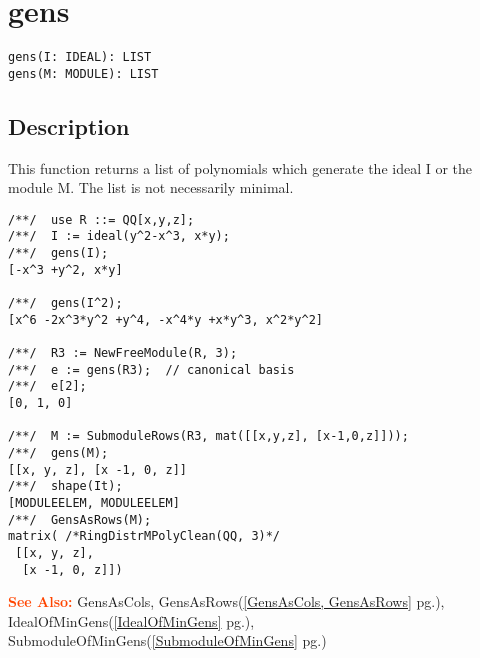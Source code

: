 \documentclass[a4paper]{mybook}
\newenvironment{command}{}{} %
\newcommand\SeeAlso{\par\textcolor{OrangeRed}{\textbf{\large See Also: }}}
\begin{document}
\section{gens}
\label{gens}
\begin{command} %


\begin{Verbatim}[label=syntax, rulecolor=\color{MidnightBlue},
frame=single]
gens(I: IDEAL): LIST
gens(M: MODULE): LIST
\end{Verbatim}


\subsection*{Description}

This function returns a list of polynomials which generate the ideal
I or the module M.  The list is not necessarily minimal.
\begin{Verbatim}[label=example, rulecolor=\color{PineGreen}, frame=single]
/**/  use R ::= QQ[x,y,z];
/**/  I := ideal(y^2-x^3, x*y);
/**/  gens(I);
[-x^3 +y^2, x*y]

/**/  gens(I^2);
[x^6 -2x^3*y^2 +y^4, -x^4*y +x*y^3, x^2*y^2]

/**/  R3 := NewFreeModule(R, 3);
/**/  e := gens(R3);  // canonical basis
/**/  e[2];
[0, 1, 0]

/**/  M := SubmoduleRows(R3, mat([[x,y,z], [x-1,0,z]]));
/**/  gens(M);
[[x, y, z], [x -1, 0, z]]
/**/  shape(It);
[MODULEELEM, MODULEELEM]
/**/  GensAsRows(M);
matrix( /*RingDistrMPolyClean(QQ, 3)*/
 [[x, y, z],
  [x -1, 0, z]])
\end{Verbatim}


\SeeAlso %
  GensAsCols, GensAsRows(\ref{GensAsCols, GensAsRows} pg.\pageref{GensAsCols, GensAsRows}), 
    IdealOfMinGens(\ref{IdealOfMinGens} pg.\pageref{IdealOfMinGens}), 
    SubmoduleOfMinGens(\ref{SubmoduleOfMinGens} pg.\pageref{SubmoduleOfMinGens})
\end{command} %
\end{document}
